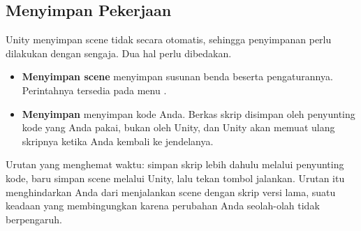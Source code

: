 \subsection{Menyimpan Pekerjaan}

Unity menyimpan scene tidak secara otomatis, sehingga penyimpanan perlu
dilakukan dengan sengaja. Dua hal perlu dibedakan.

\begin{itemize}
  \item \textbf{Menyimpan scene} menyimpan susunan benda beserta pengaturannya.
        Perintahnya tersedia pada menu .
  \item \textbf{Menyimpan } menyimpan kode Anda. Berkas skrip
        disimpan oleh penyunting kode yang Anda pakai, bukan oleh Unity, dan
        Unity akan memuat ulang skripnya ketika Anda kembali ke jendelanya.
\end{itemize}

\begin{tipsbox}
Urutan yang menghemat waktu: simpan skrip lebih dahulu melalui penyunting kode,
baru simpan scene melalui Unity, lalu tekan tombol jalankan. Urutan itu
menghindarkan Anda dari menjalankan scene dengan skrip versi lama, suatu
keadaan yang membingungkan karena perubahan Anda seolah-olah tidak
berpengaruh.
\end{tipsbox}
